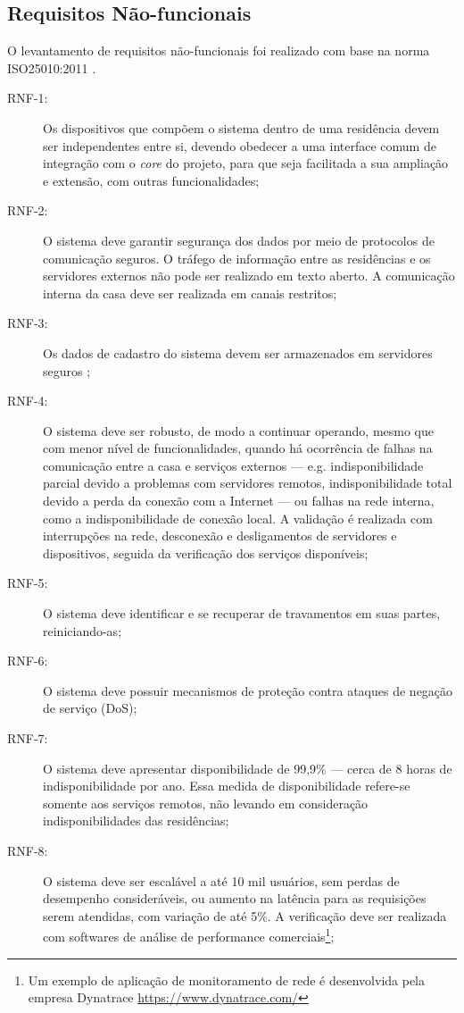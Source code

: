 \subsection{Requisitos Não-funcionais}
O levantamento de requisitos não-funcionais foi realizado com base na norma ISO25010:2011 \cite{iso25010}.

\begin{description}
\item[RNF-1:]Os dispositivos que compõem o sistema dentro de uma residência devem ser independentes entre si, devendo obedecer a uma interface comum de integração com o \emph{core} do projeto, para que seja facilitada a sua ampliação e extensão, com outras funcionalidades;
\item[RNF-2:]O sistema deve garantir segurança dos dados por meio de protocolos de comunicação seguros. O tráfego de informação entre as residências e os servidores externos não pode ser realizado em texto aberto. A comunicação interna da casa deve ser realizada em canais restritos;
\item[RNF-3:]Os dados de cadastro do sistema devem ser armazenados em servidores seguros \cite{softwareSecurity};
\item[RNF-4:]O sistema deve ser robusto, de modo a continuar operando, mesmo que com menor nível de funcionalidades, quando há ocorrência de falhas na comunicação entre a casa e serviços externos --- e.g. indisponibilidade parcial devido a problemas com servidores remotos, indisponibilidade total devido a perda da conexão com a Internet --- ou falhas na rede interna, como a indisponibilidade de conexão local. A validação é realizada com interrupções na rede, desconexão e desligamentos de servidores e dispositivos, seguida da verificação dos serviços disponíveis;
\item[RNF-5:]O sistema deve identificar e se recuperar de travamentos em suas partes, reiniciando-as;
\item[RNF-6:]O sistema deve possuir mecanismos de proteção contra ataques de negação de serviço (DoS);
\item[RNF-7:]O sistema deve apresentar disponibilidade de 99,9\% --- cerca de 8 horas de indisponibilidade por ano. Essa medida de disponibilidade refere-se somente aos serviços remotos, não levando em consideração indisponibilidades das residências;
\item[RNF-8:]O sistema deve ser escalável a até 10 mil usuários, sem perdas de desempenho consideráveis, ou aumento na latência para as requisições serem atendidas, com variação de até 5\%. A verificação deve ser realizada com softwares de análise de performance comerciais\footnote{Um exemplo de aplicação de monitoramento de rede é desenvolvida pela empresa Dynatrace \url{https://www.dynatrace.com/} };

\end{description}
